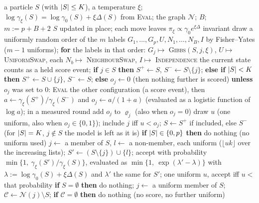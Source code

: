 \begin{algorithm}
\caption{The Markov moves: one round, and the four kinds of move with their acceptance probabilities.}\label{alg:moves}
{\footnotesize
\begin{algorithmic}[1]
\Require a particle $S$ (with $\lvert S\rvert\le K$), a temperature $\xi$; $\log\gamma_\xi(S)=\log\gamma_0(S)+\xi\Delta(S)$ from \textsc{Eval}; the graph $\mathcal N$; $B$; $m:=p+B+2$
\Ensure $S$ updated in place; each move leaves $\pi_\xi\propto\gamma_0e^{\xi\Delta}$ invariant
\State draw a uniformly random order of the $m$ labels $G_1,\dots,G_p,U,N_1,\dots,N_B,I$ by Fisher--Yates ($m-1$ uniforms); \textbf{for} the labels in that order: $G_j\mapsto$ \textsc{Gibbs}$(S,j,\xi)$, $U\mapsto$ \textsc{UniformSwap}, each $N_b\mapsto$ \textsc{NeighbourSwap}, $I\mapsto$ \textsc{Independence} %
\EndProcedure
{}
\State the current state counts as a held score event; \textbf{if} $j\in S$ \textbf{then} $S^+\gets S$, $S^-\gets S\setminus\{j\}$; \textbf{else if} $\lvert S\rvert<K$ \textbf{then} $S^+\gets S\cup\{j\}$, $S^-\gets S$; \textbf{else} $o_j\gets0$ (then nothing further is scored) %
\State \textbf{unless} $o_j$ was set to $0$: \textsc{Eval} the other configuration (a score event), then $a\gets\gamma_\xi(S^+)/\gamma_\xi(S^-)$ and $o_j\gets a/(1+a)$ (evaluated as a logistic function of $\log a$); in a measured round add $o_j$ to $\varrho_j$ (also when $o_j=0$) %
\State draw $u$ (one uniform, also when $o_j\in\{0,1\}$); include $j$ iff $u<o_j$; $S\gets S^+$ if included, else $S^-$ (for $\lvert S\rvert=K$, $j\notin S$ the model is left as it is) %
\EndProcedure
{}
\State \textbf{if} $\lvert S\rvert\in\{0,p\}$ \textbf{then} do nothing (no uniform used) %
\State $j\gets$ a member of $S$, $l\gets$ a non-member, each uniform ($\lfloor uk\rfloor$ over the increasing lists); $S'\gets(S\setminus\{j\})\cup\{l\}$; accept with probability $\min\{1,\ \gamma_\xi(S')/\gamma_\xi(S)\}$, evaluated as $\min\{1,\ \exp(\lambda'-\lambda)\}$ with $\lambda:=\log\gamma_0(S)+\xi\Delta(S)$ and $\lambda'$ the same for $S'$; one uniform $u$, accept iff $u<$ that probability %
\EndProcedure
{}
\State \textbf{if} $S=\emptyset$ \textbf{then} do nothing; $j\gets$ a uniform member of $S$; $\mathcal C\gets\mathcal N(j)\setminus S$; \textbf{if} $\mathcal C=\emptyset$ \textbf{then} do nothing (no score, no further uniform) %

\end{algorithmic}}
\end{algorithm}

